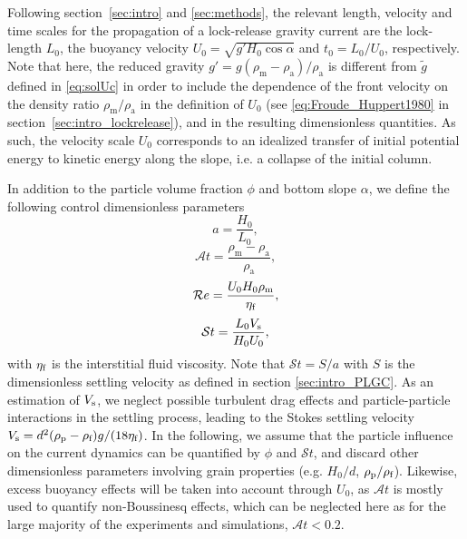\documentclass[12pt]{article}
\begin{document}
Following section~\ref{sec:intro} and \ref{sec:methods}, the relevant length, velocity and time scales for the propagation of a lock-release gravity current are the lock-length $L_{0}$, the buoyancy velocity $U_{0}=\sqrt{g' H_0 \cos\alpha}$ and $t_{0} = L_{0}/U_{0}$, respectively.
%
Note that here, the reduced gravity $g' = g (\rho_{\text{m}}-\rho_{\text{a}})/\rho_{\text{a}}$ is different from $\tilde{g}$ defined in \eqref{eq:solUc} in order to include the dependence of the front velocity on the density ratio $\rho_{\text{m}}/\rho_{\text{a}}$ in the definition of $U_{0}$ (see \eqref{eq:Froude_Huppert1980} in section~\ref{sec:intro_lockrelease}), and in the resulting dimensionless quantities. As such, the velocity scale $U_0$ corresponds to an idealized transfer of initial potential energy to kinetic energy along the slope, i.e. a collapse of the initial column.

In addition to the particle volume fraction $\phi$ and bottom slope $\alpha$, we define the following control dimensionless parameters
\begin{equation}
	\displaystyle a =\frac{H_0}{L_0},
\end{equation}
\begin{equation}
	\displaystyle \mathcal{A}t = \frac{\rho_{\text{m}}-\rho_{\text{a}}}{\rho_{\text{a}}},
\end{equation}
\begin{equation}
	\displaystyle \mathcal{R}e = \frac{U_0 H_0\rho_{\text m}}{\eta_{\text f}},
\end{equation}
\begin{equation}
	\displaystyle \mathcal{S}t = \frac{L_{0} V_{\text s}}{H_{0} U_0},
\end{equation}
%
with $\eta_{{\text f}}$ is the interstitial fluid viscosity. Note that $\mathcal{S}t=S/a$ with $S$ is the dimensionless settling velocity as defined in section \ref{sec:intro_PLGC}. As an estimation of $V_{\text s}$, we neglect possible turbulent drag effects and particle-particle interactions in the settling process, leading to the Stokes settling velocity $V_{\text s} = d^{2}(\rho_{\text{p}} - \rho_{\text{f}})g/(18\eta_{{\text f}})$.
%
In the following, we assume that the particle influence on the current dynamics can be quantified by $\phi$ and $\mathcal{S}t$, and discard other dimensionless parameters involving grain properties (e.g. $H_{0}/d$, $\rho_{\text p}/\rho_{\text{f}}$).
%
Likewise, excess buoyancy effects will be taken into account through $U_{0}$, as $\mathcal{A}t$ is mostly used to quantify non-Boussinesq effects, which can be neglected here as for the large majority of the experiments and simulations, $\mathcal{A}t < 0.2$.
\end{document}
